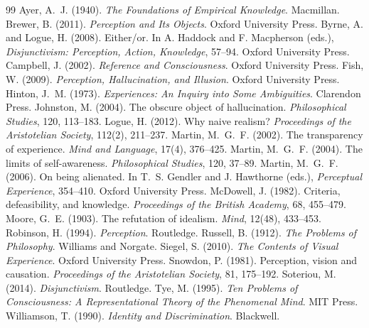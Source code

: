 \documentclass{situationist-preprint}
\begin{document}
\begin{thebibliography}{99}\small
{} Ayer, A.~J. (1940). \emph{The Foundations of Empirical Knowledge}. Macmillan.
 Brewer, B. (2011). \emph{Perception and Its Objects}. Oxford University Press.
 Byrne, A. and Logue, H. (2008). Either/or. In A. Haddock and F. Macpherson (eds.), \emph{Disjunctivism: Perception, Action, Knowledge}, 57--94. Oxford University Press.
 Campbell, J. (2002). \emph{Reference and Consciousness}. Oxford University Press.
 Fish, W. (2009). \emph{Perception, Hallucination, and Illusion}. Oxford University Press.
 Hinton, J.~M. (1973). \emph{Experiences: An Inquiry into Some Ambiguities}. Clarendon Press.
 Johnston, M. (2004). The obscure object of hallucination. \emph{Philosophical Studies}, 120, 113--183.
 Logue, H. (2012). Why naive realism? \emph{Proceedings of the Aristotelian Society}, 112(2), 211--237.
 Martin, M.~G.~F. (2002). The transparency of experience. \emph{Mind and Language}, 17(4), 376--425.
 Martin, M.~G.~F. (2004). The limits of self-awareness. \emph{Philosophical Studies}, 120, 37--89.
 Martin, M.~G.~F. (2006). On being alienated. In T.~S. Gendler and J. Hawthorne (eds.), \emph{Perceptual Experience}, 354--410. Oxford University Press.
 McDowell, J. (1982). Criteria, defeasibility, and knowledge. \emph{Proceedings of the British Academy}, 68, 455--479.
 Moore, G.~E. (1903). The refutation of idealism. \emph{Mind}, 12(48), 433--453.
 Robinson, H. (1994). \emph{Perception}. Routledge.
 Russell, B. (1912). \emph{The Problems of Philosophy}. Williams and Norgate.
 Siegel, S. (2010). \emph{The Contents of Visual Experience}. Oxford University Press.
 Snowdon, P. (1981). Perception, vision and causation. \emph{Proceedings of the Aristotelian Society}, 81, 175--192.
 Soteriou, M. (2014). \emph{Disjunctivism}. Routledge.
 Tye, M. (1995). \emph{Ten Problems of Consciousness: A Representational Theory of the Phenomenal Mind}. MIT Press.
 Williamson, T. (1990). \emph{Identity and Discrimination}. Blackwell.
\end{thebibliography}
\end{document}
